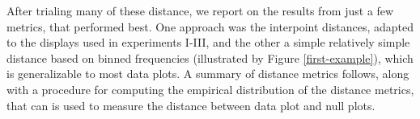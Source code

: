\documentclass[12pt]{article}\usepackage[]{graphicx}\usepackage[]{color}
\begin{document}

After trialing many of these distance, we report on the results from just a few metrics, that performed best. One approach was the interpoint distances, adapted to the displays used in experiments I-III, and the other a simple relatively simple distance based on binned frequencies (illustrated by Figure \ref{first-example}), which is generalizable to most data plots. 
A summary of distance metrics follows, along with a procedure for computing the empirical distribution of the distance metrics, that can is used to measure the distance between data plot and null plots. 
\end{document}
